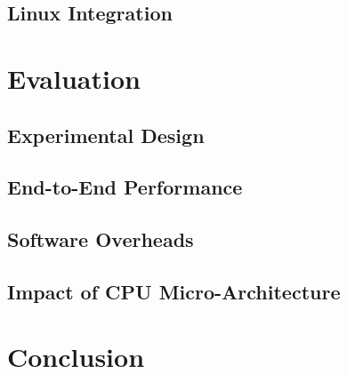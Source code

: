 \documentclass[12pt]{article}
\begin{document}
    \subsection{Linux Integration} \label{sec_linuxImpl}
        

\section{Evaluation} \label{sec_eval}
    \subsection{Experimental Design} \label{sec_expDesign}
        
    \subsection{End-to-End Performance} \label{sec_fullPerf}
        
    \subsection{Software Overheads} \label{sec_swOverhead}
        
    \subsection{Impact of CPU Micro-Architecture} \label{sec_uarchImpact}
        
        
\section{Conclusion} \label{sec_conclusion}
    

\listoftodos



\end{document}
